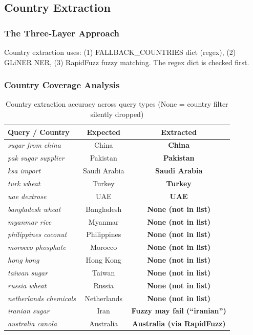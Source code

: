 \documentclass[12pt,a4paper]{article}
\newcommand{\cellOK}[1]{\cellcolor{okBg}\textcolor{zaraiGreen}{\textbf{#1}}}
\newcommand{\cellWarn}[1]{\cellcolor{warningBg}\textcolor{zaraiAmber}{\textbf{#1}}}
\newcommand{\cellBad}[1]{\cellcolor{errorBg}\textcolor{zaraiRed}{\textbf{#1}}}
\begin{document}
\subsection{Country Extraction}

\subsubsection{The Three-Layer Approach}

Country extraction uses: (1) FALLBACK\_COUNTRIES dict (regex), (2) GLiNER NER,
(3) RapidFuzz fuzzy matching. The regex dict is checked first.

\subsubsection{Country Coverage Analysis}

\begin{table}[H]
\centering
\renewcommand{\arraystretch}{1.3}
\begin{tabularx}{\textwidth}{Xcc}
\toprule
\textbf{Query / Country} & \textbf{Expected} & \textbf{Extracted} \\
\midrule
\textit{sugar from china} & China & \cellOK{China} \\
\textit{pak sugar supplier} & Pakistan & \cellOK{Pakistan} \\
\textit{ksa import} & Saudi Arabia & \cellOK{Saudi Arabia} \\
\textit{turk wheat} & Turkey & \cellOK{Turkey} \\
\textit{uae dextrose} & UAE & \cellOK{UAE} \\
\textit{bangladesh wheat} & Bangladesh & \cellBad{None (not in list)} \\
\textit{myanmar rice} & Myanmar & \cellBad{None (not in list)} \\
\textit{philippines coconut} & Philippines & \cellBad{None (not in list)} \\
\textit{morocco phosphate} & Morocco & \cellBad{None (not in list)} \\
\textit{hong kong} & Hong Kong & \cellBad{None (not in list)} \\
\textit{taiwan sugar} & Taiwan & \cellBad{None (not in list)} \\
\textit{russia wheat} & Russia & \cellBad{None (not in list)} \\
\textit{netherlands chemicals} & Netherlands & \cellBad{None (not in list)} \\
\textit{iranian sugar} & Iran & \cellWarn{Fuzzy may fail (``iranian'')} \\
\textit{australia canola} & Australia & \cellOK{Australia (via RapidFuzz)} \\
\bottomrule
\end{tabularx}
\caption{Country extraction accuracy across query types (None = country filter silently dropped)}
\end{table}
\end{document}
